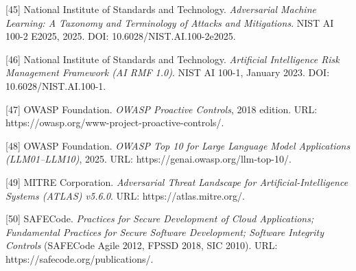 \documentclass[
]{article}
\begin{document}
{[}45{]} National Institute of Standards and Technology.
\emph{Adversarial Machine Learning: A Taxonomy and Terminology of
Attacks and Mitigations}. NIST AI 100-2 E2025, 2025. DOI:
10.6028/NIST.AI.100-2e2025.

{[}46{]} National Institute of Standards and Technology.
\emph{Artificial Intelligence Risk Management Framework (AI RMF 1.0)}.
NIST AI 100-1, January 2023. DOI: 10.6028/NIST.AI.100-1.

{[}47{]} OWASP Foundation. \emph{OWASP Proactive Controls}, 2018
edition. URL: https://owasp.org/www-project-proactive-controls/.

{[}48{]} OWASP Foundation. \emph{OWASP Top 10 for Large Language Model
Applications (LLM01--LLM10)}, 2025. URL:
https://genai.owasp.org/llm-top-10/.

{[}49{]} MITRE Corporation. \emph{Adversarial Threat Landscape for
Artificial-Intelligence Systems (ATLAS) v5.6.0}. URL:
https://atlas.mitre.org/.

{[}50{]} SAFECode. \emph{Practices for Secure Development of Cloud
Applications; Fundamental Practices for Secure Software Development;
Software Integrity Controls} (SAFECode Agile 2012, FPSSD 2018, SIC
2010). URL: https://safecode.org/publications/.
\end{document}
